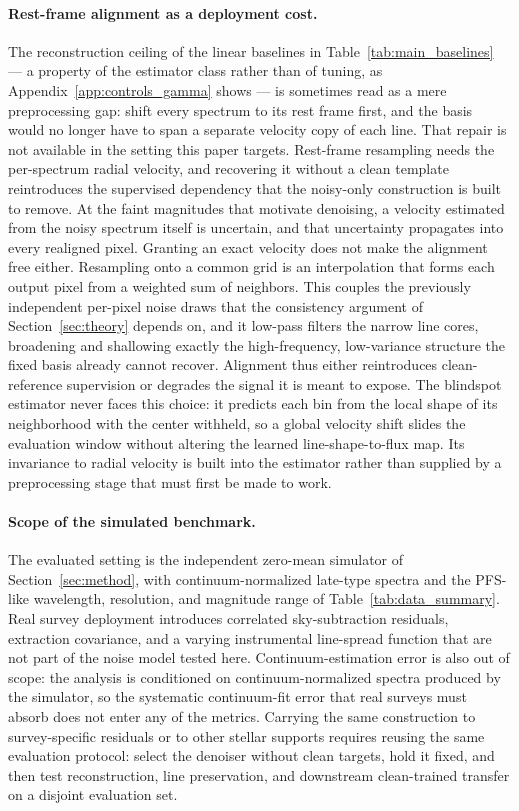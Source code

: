 \documentclass[twocolumn]{aastex7}
\newcounter{protocol}
\begin{document}
\paragraph{Rest-frame alignment as a deployment cost.} The reconstruction ceiling of the linear baselines in Table~\ref{tab:main_baselines} --- a property of the estimator class rather than of tuning, as Appendix~\ref{app:controls_gamma} shows --- is sometimes read as a mere preprocessing gap: shift every spectrum to its rest frame first, and the basis would no longer have to span a separate velocity copy of each line. That repair is not available in the setting this paper targets. Rest-frame resampling needs the per-spectrum radial velocity, and recovering it without a clean template reintroduces the supervised dependency that the noisy-only construction is built to remove. At the faint magnitudes that motivate denoising, a velocity estimated from the noisy spectrum itself is uncertain, and that uncertainty propagates into every realigned pixel. Granting an exact velocity does not make the alignment free either. Resampling onto a common grid is an interpolation that forms each output pixel from a weighted sum of neighbors. This couples the previously independent per-pixel noise draws that the consistency argument of Section~\ref{sec:theory} depends on, and it low-pass filters the narrow line cores, broadening and shallowing exactly the high-frequency, low-variance structure the fixed basis already cannot recover. Alignment thus either reintroduces clean-reference supervision or degrades the signal it is meant to expose. The blindspot estimator never faces this choice: it predicts each bin from the local shape of its neighborhood with the center withheld, so a global velocity shift slides the evaluation window without altering the learned line-shape-to-flux map. Its invariance to radial velocity is built into the estimator rather than supplied by a preprocessing stage that must first be made to work.

\paragraph{Scope of the simulated benchmark.} The evaluated setting is the independent zero-mean simulator of Section~\ref{sec:method}, with continuum-normalized late-type spectra and the PFS-like wavelength, resolution, and magnitude range of Table~\ref{tab:data_summary}. Real survey deployment introduces correlated sky-subtraction residuals, extraction covariance, and a varying instrumental line-spread function that are not part of the noise model tested here. Continuum-estimation error is also out of scope: the analysis is conditioned on continuum-normalized spectra produced by the simulator, so the systematic continuum-fit error that real surveys must absorb does not enter any of the metrics. Carrying the same construction to survey-specific residuals or to other stellar supports requires reusing the same evaluation protocol: select the denoiser without clean targets, hold it fixed, and then test reconstruction, line preservation, and downstream clean-trained transfer on a disjoint evaluation set.
\end{document}
